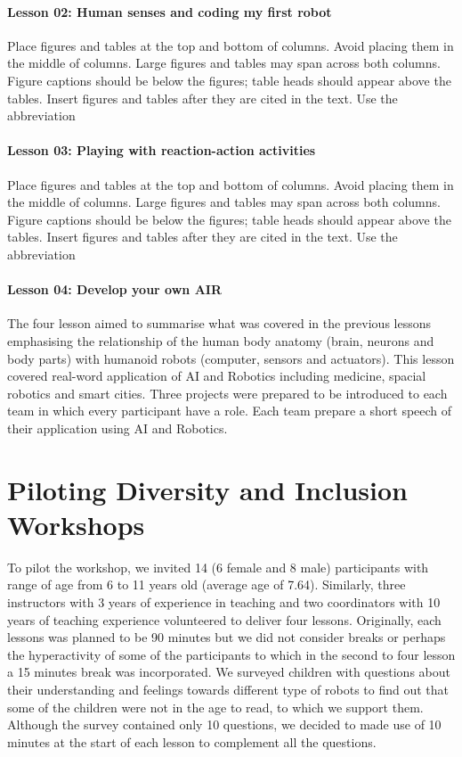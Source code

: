\documentclass[conference]{IEEEtran}
\begin{document}
\paragraph{Lesson 02: Human senses and coding my first robot} 
Place figures and tables at the top and bottom of columns. Avoid placing them in the middle of columns. 
Large figures and tables may span across both columns. Figure captions should be below the figures; table heads should appear above the tables. 
Insert figures and tables after they are cited in the text. Use the abbreviation 

\paragraph{Lesson 03: Playing with reaction-action activities} 
Place figures and tables at the top and bottom of columns. Avoid placing them in the middle of columns. 
Large figures and tables may span across both columns. Figure captions should be below the figures; table heads should appear above the tables. 
Insert figures and tables after they are cited in the text. Use the abbreviation 

\paragraph{Lesson 04: Develop your own AIR}
The four lesson aimed to summarise what was covered in the previous lessons emphasising the relationship of the human body anatomy (brain, neurons and body parts) with humanoid robots (computer, sensors and actuators).
This lesson covered real-word application of AI and Robotics including medicine, spacial robotics and smart cities. 
Three projects were prepared to be introduced to each team in which every participant have a role. 
Each team prepare a short speech of their application using AI and Robotics. 

\section{Piloting Diversity and Inclusion Workshops}
To pilot the workshop, we invited 14 (6 female and 8 male) participants with range of age from 6 to 11 years old (average age of 7.64).
Similarly, three instructors with 3 years of experience in teaching and two coordinators with 10 years of teaching experience volunteered to deliver four lessons.
Originally, each lessons was planned to be 90 minutes but we did not consider breaks or perhaps the hyperactivity of some of the participants to which in the second to four lesson a 15 minutes break was incorporated.
We surveyed children with questions about their understanding and feelings towards different type of robots to find out that some of the children were not in the age to read, to which we support them. 
Although the survey contained only 10 questions, we decided to made use of 10 minutes at the start of each lesson to complement all the questions.
\end{document}
